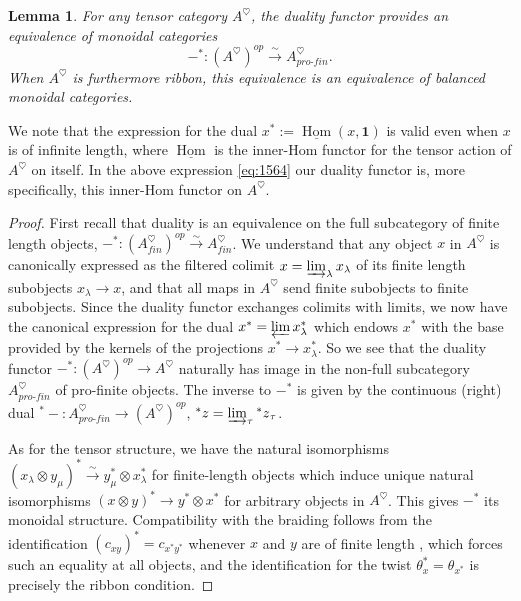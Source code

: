 \documentclass[reqno]{amsart}
\newtheorem{lemma}{Lemma}[section]
\theoremstyle{definition}
\newcommand{\ot}{\otimes}
\newcommand{\pf}{pro\text{-}fin}
\DeclareMathOperator{\Hom}{Hom}
\renewcommand{\1}{\mathbf{1}}
\begin{document}
\begin{lemma}\label{lem:1572}
For any tensor category $A^{\heartsuit}$, the duality functor provides an equivalence of monoidal categories
\begin{equation}\label{eq:1564}
-^{\ast}:(A^{\heartsuit})^{op}\overset{\sim}\to A^{\heartsuit}_{\pf}.
\end{equation}
When $A^{\heartsuit}$ is furthermore ribbon, this equivalence is an equivalence of balanced monoidal categories.
\end{lemma}

We note that the expression for the dual $x^{\ast}:=\underline{\Hom}(x,\1)$ is valid even when $x$ is of infinite length, where $\underline{\Hom}$ is the inner-Hom functor for the tensor action of $A^{\heartsuit}$ on itself. In the above expression \eqref{eq:1564} our duality functor is, more specifically, this inner-Hom functor on $A^{\heartsuit}$.

\begin{proof}
First recall that duality is an equivalence on the full subcategory of finite length objects, $-^{\ast}:(A^{\heartsuit}_{fin})^{op}\overset{\sim}\to A^{\heartsuit}_{fin}$. We understand that any object $x$ in $A^{\heartsuit}$ is canonically expressed as the filtered colimit $x=\varinjlim_{\lambda}x_\lambda$ of its finite length subobjects $x_\lambda\to x$, and that all maps in $A^{\heartsuit}$ send finite subobjects to finite subobjects.  Since the duality functor exchanges colimits with limits, we now have the canonical expression for the dual $x^{\ast}=\varprojlim x^{\ast}_{\lambda}$ which endows $x^{\ast}$ with the base provided by the kernels of the projections $x^{\ast}\to x^{\ast}_{\lambda}$.  So we see that the duality functor $-^{\ast}:(A^{\heartsuit})^{op}\to A^{\heartsuit}$ naturally has image in the non-full subcategory $A^{\heartsuit}_{\pf}$ of pro-finite objects.  The inverse to $-^{\ast}$ is given by the continuous (right) dual ${^{\ast}-}:A^{\heartsuit}_{\pf}\to (A^{\heartsuit})^{op}$, ${^{\ast}z}=\varinjlim_{\tau}{^{\ast}z}_\tau$.
\par

As for the tensor structure, we have the natural isomorphisms $(x_{\lambda}\ot y_{\mu})^{\ast}\overset{\sim}\to y^{\ast}_{\mu}\ot x^{\ast}_{\lambda}$ for finite-length objects which induce unique natural isomorphisms $(x\ot y)^{\ast}\to y^{\ast}\ot x^{\ast}$ for arbitrary objects in $A^{\heartsuit}$.  This gives $-^{\ast}$ its monoidal structure.  Compatibility with the braiding follows from the identification $(c_{xy})^{\ast}= c_{x^{\ast}y^{\ast}}$ whenever $x$ and $y$ are of finite length \cite[Lemma 2.1.11]{bakalovkirillov01}, which forces such an equality at all objects, and the identification for the twist $\theta^{\ast}_x=\theta_{x^{\ast}}$ is precisely the ribbon condition. 
\end{proof}
\end{document}
